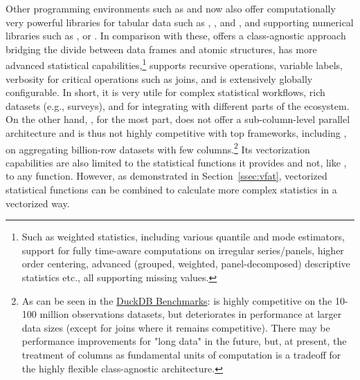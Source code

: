 \documentclass[nojss]{jss} %
\begin{document}
Other programming environments such as  and  now also offer computationally very powerful libraries for tabular data such as  \citep{jldataframes},  \citep{pypolars}, and  \citep{mckinney2010pandas, pypandas}, and supporting numerical libraries such as  \citep{pynumpy}, or  \citep{jlstatsbase}. %
In comparison with these,  offers a class-agnostic approach bridging the divide between data frames and atomic structures, has more advanced statistical capabilities,\footnote{Such as weighted statistics, including various quantile and mode estimators, support for fully time-aware computations on irregular series/panels, higher order centering, advanced (grouped, weighted, panel-decomposed) descriptive statistics etc., all supporting missing values.} supports recursive operations, variable labels, verbosity for critical operations such as joins, and is extensively globally configurable. In short, it is very utile for complex statistical workflows, rich datasets (e.g., surveys), and for integrating with different parts of the  ecosystem. On the other hand, , for the most part, does not offer a sub-column-level parallel architecture and is thus not highly competitive with top frameworks, including , on aggregating billion-row datasets with few columns.\footnote{As can be seen in the \href{https://duckdblabs.github.io/db-benchmark/}{DuckDB Benchmarks}:  is highly competitive on the 10-100 million observations datasets, but deteriorates in performance at larger data sizes (except for joins where it remains competitive). There may be performance improvements for "long data" in the future, but, at present, the treatment of columns as fundamental units of computation is a tradeoff for the highly flexible class-agnostic architecture.} Its vectorization capabilities are also limited to the statistical functions it provides and not, like , to any  function. However, as demonstrated in Section~\ref{ssec:vfat}, vectorized statistical functions can be combined to calculate more complex statistics in a vectorized way. \newline
\end{document}
